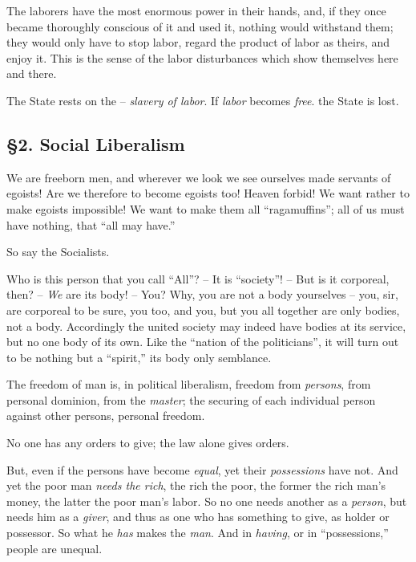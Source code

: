 \documentclass[12pt,a4paper]{book}
\begin{document}
The laborers have the most enormous power in their hands, and, if they once 
became thoroughly conscious of it and used it, nothing would withstand them; 
they would only have to stop labor, regard the product of labor as theirs, and 
enjoy it. This is the sense of the labor disturbances which show themselves 
here and there.

The State rests on the -- \textit{slavery of labor}. If \textit{labor} becomes 
\textit{free}. the State is lost.

\subsection[\S{}2. Social Liberalism]{\centering \S{}2. Social Liberalism}

We are freeborn men, and wherever we look we see ourselves made servants of 
egoists! Are we therefore to become egoists too! Heaven forbid! We want rather 
to make egoists impossible! We want to make them all ``ragamuffins''; all of 
us must have nothing, that ``all may have.''

So say the Socialists.

Who is this person that you call ``All''? -- It is ``society''! -- But is 
it corporeal, then? -- \textit{We} are its body! -- You? Why, you are not a 
body yourselves -- you, sir, are corporeal to be sure, you too, and you, but 
you all together are only bodies, not a body. Accordingly the united society 
may indeed have bodies at its service, but no one body of its own. Like the 
``nation of the politicians'', it will turn out to be nothing but a 
``spirit,'' its body only semblance.

The freedom of man is, in political liberalism, freedom from \textit{persons}, 
from personal dominion, from the \textit{master}; the securing of each 
individual person against other persons, personal freedom.

No one has any orders to give; the law alone gives orders.

But, even if the persons have become \textit{equal}, yet their 
\textit{possessions} have not. And yet the poor man \textit{needs the rich}, 
the rich the poor, the former the rich man's money, the latter the poor man's 
labor. So no one needs another as a \textit{person}, but needs him as a 
\textit{giver}, and thus as one who has something to give, as holder or 
possessor. So what he \textit{has} makes the \textit{man}. And in 
\textit{having}, or in ``possessions,'' people are unequal.
\end{document}
